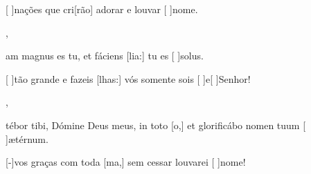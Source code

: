 {    {\item {}[ ]{na}ções que cri[rão] adorar e louvar [ ]{no}me.~\Antiphona},
  {\item {}am magnus es tu, et fáciens [lia:] tu es [ ]{so}lus.~\Antiphona}%
    {\item {}[ ]{tão} grande e fazeis [lhas:] vós somente sois [ ]{e}[ ]{Se}nhor!~\Antiphona},
  {\item {}tébor tibi, Dómine Deus meus, in toto [o,] et glorificábo nomen tuum [ ]{æ}{tér}num.~\Antiphona}%
    {\item {}[-]{vos} graças com toda [ma,] sem cessar louvarei [ ]{no}me!~\Antiphona}
}